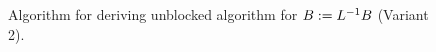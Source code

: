 \documentclass{article}
\begin{document}
\renewcommand{\partitionsizes}{
$ \ArgOne_{TL} $ is $ 0 \times 0 $ and 
$ \ArgTwo_{T} $ has $ 0 $ rows
}


\renewcommand{\repartitionings}{
 $  \PartArgOne \rightarrow \RepartArgOne $ and
 $  \PartArgTwo \rightarrow \RepartArgTwo $
}

\renewcommand{\repartitionsizes}{
$ \lambda_{11} $ is a scalar and $ b_1^T $ is a row
}


\renewcommand{\moveboundaries}{
 $  \PartArgOne \leftarrow \MoveArgOne $,
 $  \PartArgTwo \leftarrow \MoveArgTwo $, \\
 and
 $  \PartOrigTwo \leftarrow \MoveOrigTwo $
}

\begin{figure}[tbp]

\begin{center}     %
\footnotesize      %

\FlaAlgorithm      %
\end{center}


\caption{ Algorithm for deriving unblocked algorithm for
$ B := L^{-1} B $ (Variant 2).}



\label{Trsm_llnn:alg_unb_var2}

\end{figure}
\end{document}

